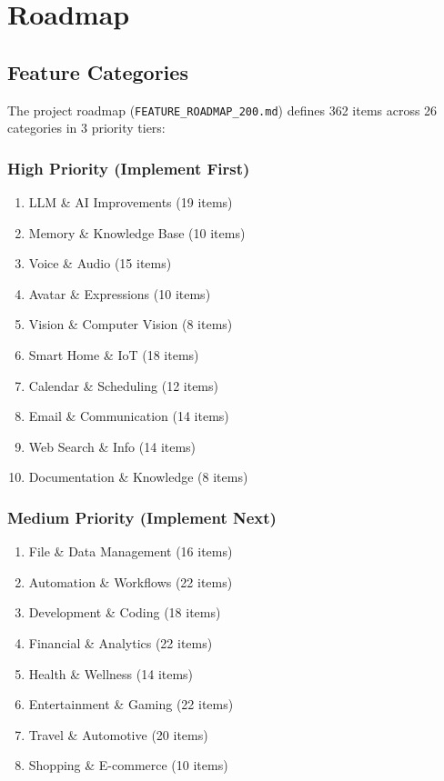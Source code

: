 \documentclass[12pt,a4paper,twoside]{report}
\begin{document}
\chapter{Roadmap}

\section{Feature Categories}

The project roadmap (\texttt{FEATURE\_ROADMAP\_200.md}) defines 362 items across 26 categories in 3 priority tiers:

\subsection{High Priority (Implement First)}

\begin{enumerate}[leftmargin=*]
    \item LLM \& AI Improvements (19 items)
    \item Memory \& Knowledge Base (10 items)
    \item Voice \& Audio (15 items)
    \item Avatar \& Expressions (10 items)
    \item Vision \& Computer Vision (8 items)
    \item Smart Home \& IoT (18 items)
    \item Calendar \& Scheduling (12 items)
    \item Email \& Communication (14 items)
    \item Web Search \& Info (14 items)
    \item Documentation \& Knowledge (8 items)
\end{enumerate}

\subsection{Medium Priority (Implement Next)}

\begin{enumerate}[leftmargin=*, start=11]
    \item File \& Data Management (16 items)
    \item Automation \& Workflows (22 items)
    \item Development \& Coding (18 items)
    \item Financial \& Analytics (22 items)
    \item Health \& Wellness (14 items)
    \item Entertainment \& Gaming (22 items)
    \item Travel \& Automotive (20 items)
    \item Shopping \& E-commerce (10 items)
\end{enumerate}
\end{document}
